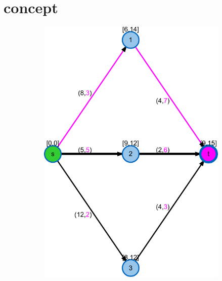 \section{}



\section{concept}

\begin{figure}
\centering
\begin{subfigure}[t]{0.45\textwidth}
\includegraphics[width=\textwidth]{fig/spp-rc-graph-algorithm-graph}
\end{subfigure}
\begin{subfigure}[t]{0.45\textwidth}

\end{subfigure}
\end{figure}
